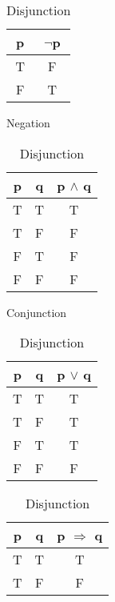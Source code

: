 \begin{defn}
\begin{table}[!htb]
   \centering
   \begin{minipage}{0.2\textwidth}
   \centering
      \begin{tabular}{|c |c|}
         \hline
         p &  $\lnot$p\\
         \hline
         T & F\\
         F & T\\
         \hline
      \end{tabular}
      \caption{\label{mod1:tab:Negation}Negation}
   \end{minipage}
   \begin{minipage}{0.38\textwidth}
      \centering
      \begin{tabular}{|c c|c|}
            \hline
            p & q & p $\land$ q\\
            \hline
            T & T & T\\
            T & F & F\\
            F & T & F\\
            F & F & F\\
            \hline
      \end{tabular}
      \caption{\label{mod1:tab:Conjunction}Conjunction}
   \end{minipage}
   \vspace{1cm}
   \begin{minipage}{0.38\textwidth}
   \centering
            \begin{tabular}{|c c|c|}
         \hline
         p & q & p $\lor$ q\\
         \hline
         T & T & T\\
         T & F & T\\
         F & T & T\\
         F & F & F\\
         \hline
      \end{tabular}
      \caption{\label{mod1:tab:Disjunction}Disjunction}
   \end{minipage}
   \hspace{6cm}
   \begin{minipage}{0.38\textwidth}
      \centering
      \begin{tabular}{|c c|c|}
         \hline
         p & q & p $\Rightarrow$ q\\
         \hline
         T & T & T\\
         T & F & F\\

\end{tabular}
\end{minipage}
\end{table}
\end{defn}

